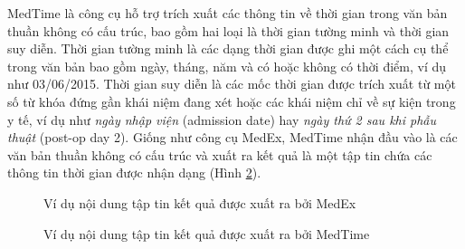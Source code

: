 MedTime là công cụ hỗ trợ trích xuất các thông tin về thời gian trong văn bản thuần không có cấu trúc, bao gồm hai loại là thời gian tường minh và thời gian suy diễn. Thời gian tường minh là các dạng thời gian được ghi một cách cụ thể trong văn bản bao gồm ngày, tháng, năm và có hoặc không có thời điểm, ví dụ như 03/06/2015. Thời gian suy diễn là các mốc thời gian được trích xuất từ một số từ khóa đứng gần khái niệm đang xét hoặc các khái niệm chỉ về sự kiện trong y tế, ví dụ như \emph{ngày nhập viện} (admission date) hay \emph{ngày thứ 2 sau khi phẫu thuật} (post-op day 2). Giống như công cụ MedEx, MedTime nhận đầu vào là các văn bản thuần không có cấu trúc và xuất ra kết quả là một tập tin chứa các thông tin thời gian được nhận dạng (Hình \ref{medtime-eg}).

%
\begin{figure}[ht]
\centering

\caption{Ví dụ nội dung tập tin kết quả được xuất ra bởi MedEx\label{medex-eg}}
\end{figure}
\begin{figure}[h!]
\centering

\caption{Ví dụ nội dung tập tin kết quả được xuất ra bởi MedTime\label{medtime-eg}}
\end{figure}
